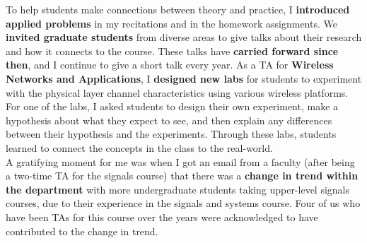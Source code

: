 \documentclass[10pt]{article}
\begin{document}
To help students make connections between theory and practice,  I \textbf{introduced applied problems} in my recitations and in the homework assignments. We \textbf{invited graduate students} from diverse areas to give talks about their research and how it connects to the course. These talks have \textbf{carried forward since then}, and I continue to give a short talk every year.
As a TA for \textbf{Wireless Networks and Applications}, I \textbf{designed new labs} for students to experiment with the physical layer channel characteristics using various wireless platforms. 
For one of the labs, I asked students to design their own experiment, make a hypothesis about what they expect to see, and then explain any differences between their hypothesis and the experiments. %
Through these labs, students learned to connect the concepts in the class to the real-world. \\%

A gratifying moment for me was when I got an email from a faculty (after being a two-time TA for the signals course)
that there was a \textbf{change in trend within the department} with more undergraduate students taking upper-level signals courses, due to their experience in the signals and systems course. Four of us who have been TAs for this course over the years were acknowledged to have contributed to the change in trend.\\
\end{document}
